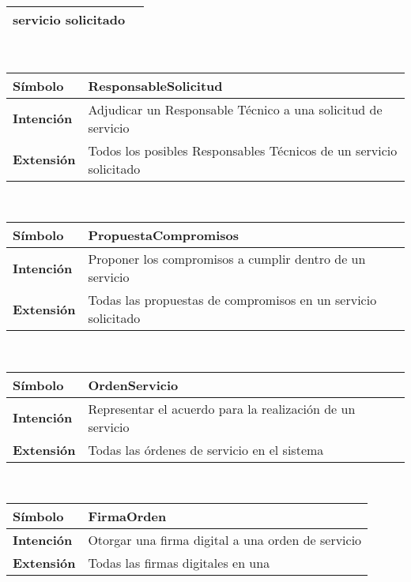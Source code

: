 \begin{center}
{\begin{tabular}{ | p{2.5cm} | p{13cm} | }
	servicio solicitado \\
	\hline
\end{tabular}} \\[1cm]
\hypertarget{responsablesolicitud}{%
\begin{tabular}{ | p{2.5cm} | p{13cm} | }
	\hline
	\cellcolor{lightgray}
	\textbf{S\'imbolo} &
	ResponsableSolicitud  \\
	\hline
	\cellcolor{lightgray}
	\textbf{Intenci\'on} &
	Adjudicar un Responsable T\'ecnico
	a una solicitud de servicio \\
	\hline
	\cellcolor{lightgray}
	\textbf{Extensi\'on} &
	Todos los posibles Responsables
	T\'ecnicos de un servicio solicitado \\
	\hline
\end{tabular}} \\[1cm]
\hypertarget{propuestacompromisos}{%
\begin{tabular}{ | p{2.5cm} | p{13cm} | }
	\hline
	\cellcolor{lightgray}
	\textbf{S\'imbolo} &
	PropuestaCompromisos  \\
	\hline
	\cellcolor{lightgray}
	\textbf{Intenci\'on} &
	Proponer los compromisos a cumplir dentro
	de un servicio \\
	\hline
	\cellcolor{lightgray}
	\textbf{Extensi\'on} &
	Todas las propuestas de compromisos en un
	servicio solicitado \\
	\hline
\end{tabular}} \\[1cm]
\hypertarget{ordenservicio}{%
\begin{tabular}{ | p{2.5cm} | p{13cm} | }
	\hline
	\cellcolor{lightgray}
	\textbf{S\'imbolo} &
	OrdenServicio  \\
	\hline
	\cellcolor{lightgray}
	\textbf{Intenci\'on} &
	Representar el acuerdo para la realizaci\'on
	de un servicio \\
	\hline
	\cellcolor{lightgray}
	\textbf{Extensi\'on} &
	Todas las \'ordenes de servicio en el
	sistema \\
	\hline
\end{tabular}} \\[1cm]
\hypertarget{firmaorden}{%
\begin{tabular}{ | p{2.5cm} | p{13cm} | }
	\hline
	\cellcolor{lightgray}
	\textbf{S\'imbolo} &
	FirmaOrden  \\
	\hline
	\cellcolor{lightgray}
	\textbf{Intenci\'on} &
	Otorgar una firma digital a una orden
	de servicio \\
	\hline
	\cellcolor{lightgray}
	\textbf{Extensi\'on} &
	Todas las firmas digitales en una

\end{tabular}}
\end{center}
